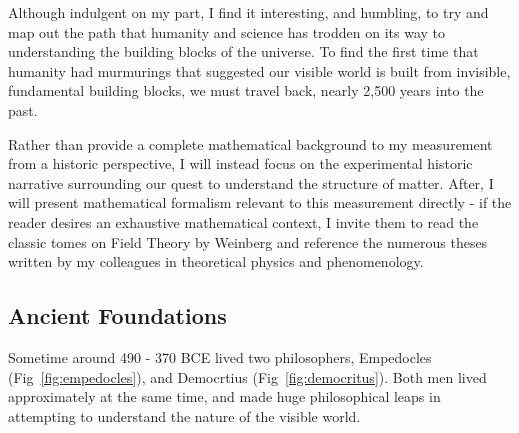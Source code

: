 Although indulgent on my part, I find it interesting, and humbling, to try and
map out the path that humanity and science has trodden on its way to
understanding the building blocks of the universe. To find the first time that
humanity had murmurings that suggested our visible world is built from
invisible, fundamental building blocks, we must travel back, nearly 2,500 years
into the past.

Rather than provide a complete mathematical background to my measurement from a
historic perspective, I will instead focus on the experimental historic
narrative surrounding our quest to understand the structure of matter. After, I
will present mathematical formalism relevant to this measurement directly - if
the reader desires an exhaustive mathematical context, I invite them to read the
classic tomes on Field Theory by Weinberg and reference the numerous theses
written by my colleagues in theoretical physics and phenomenology.

\subsection{Ancient Foundations}
Sometime around 490 - 370 BCE lived two philosophers, Empedocles
(Fig~\ref{fig:empedocles}), and Democrtius (Fig~\ref{fig:democritus}). Both men
lived approximately at the same time, and made huge philosophical leaps in
attempting to understand the nature of the visible world.

